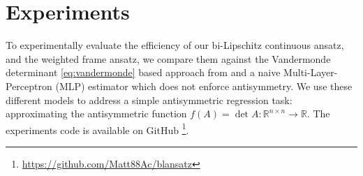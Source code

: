 \documentclass{amsart}
\newcommand{\mm}[1]{\todo[inline,color=yellow!35]{MM: #1}}
\theoremstyle{plain}
\theoremstyle{definition}
\theoremstyle{remark}
\DeclareMathOperator{\sign}{sign}
\newcommand{\RR}{\mathbb{R}}
\newcommand{\abs}[1]{\left\lvert#1\right\rvert}
\begin{document}

\section{Experiments}
To experimentally evaluate the efficiency of our bi-Lipschitz continuous ansatz, and the weighted frame ansatz, we compare them against the Vandermonde determinant \eqref{eq:vandermonde} based approach from \cite{ye2024widetilde} and a naive Multi-Layer-Perceptron (MLP) estimator which does not enforce antisymmetry. We use these different models to address a simple antisymmetric regression task: approximating the antisymmetric function $f(A) = \det{A}: \mathbb{R}^{n \times n} \rightarrow \RR$.  The experiments code is available on GitHub \footnote{\url{https://github.com/Matt88Ac/blansatz}}.
\end{document}
